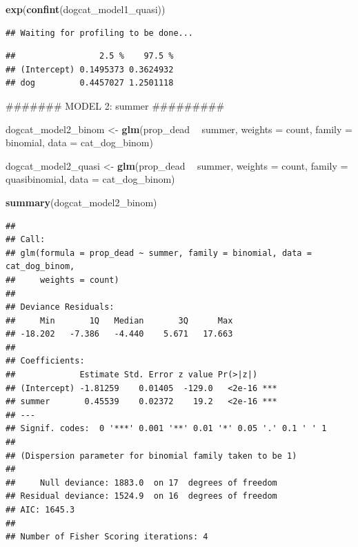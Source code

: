 \documentclass[]{article}
\newenvironment{Shaded}{\begin{snugshade}}{\end{snugshade}}
\newcommand{\KeywordTok}[1]{\textcolor[rgb]{0.13,0.29,0.53}{\textbf{#1}}}
\newcommand{\DataTypeTok}[1]{\textcolor[rgb]{0.13,0.29,0.53}{#1}}
\newcommand{\StringTok}[1]{\textcolor[rgb]{0.31,0.60,0.02}{#1}}
\newcommand{\OperatorTok}[1]{\textcolor[rgb]{0.81,0.36,0.00}{\textbf{#1}}}
\newcommand{\NormalTok}[1]{#1}
\begin{document}
\begin{Shaded}
\begin{Highlighting}[]
\KeywordTok{exp}\NormalTok{(}\KeywordTok{confint}\NormalTok{(dogcat_model1_quasi))}
\end{Highlighting}
\end{Shaded}

\begin{verbatim}
## Waiting for profiling to be done...
\end{verbatim}

\begin{verbatim}
##                 2.5 %    97.5 %
## (Intercept) 0.1495373 0.3624932
## dog         0.4457027 1.2501118
\end{verbatim}

\begin{Shaded}
\begin{Highlighting}[]
\NormalTok{####### MODEL 2: summer #########}

\NormalTok{dogcat_model2_binom <-}\StringTok{ }\KeywordTok{glm}\NormalTok{(prop_dead }\OperatorTok{~}\StringTok{ }\NormalTok{summer, }\DataTypeTok{weights =}\NormalTok{ count, }\DataTypeTok{family =}\NormalTok{ binomial, }\DataTypeTok{data =}\NormalTok{ cat_dog_binom)}

\NormalTok{dogcat_model2_quasi <-}\StringTok{ }\KeywordTok{glm}\NormalTok{(prop_dead }\OperatorTok{~}\StringTok{ }\NormalTok{summer, }\DataTypeTok{weights =}\NormalTok{ count, }\DataTypeTok{family =}\NormalTok{ quasibinomial, }\DataTypeTok{data =}\NormalTok{ cat_dog_binom)}

\KeywordTok{summary}\NormalTok{(dogcat_model2_binom)}
\end{Highlighting}
\end{Shaded}

\begin{verbatim}
## 
## Call:
## glm(formula = prop_dead ~ summer, family = binomial, data = cat_dog_binom, 
##     weights = count)
## 
## Deviance Residuals: 
##     Min       1Q   Median       3Q      Max  
## -18.202   -7.386   -4.440    5.671   17.663  
## 
## Coefficients:
##             Estimate Std. Error z value Pr(>|z|)    
## (Intercept) -1.81259    0.01405  -129.0   <2e-16 ***
## summer       0.45539    0.02372    19.2   <2e-16 ***
## ---
## Signif. codes:  0 '***' 0.001 '**' 0.01 '*' 0.05 '.' 0.1 ' ' 1
## 
## (Dispersion parameter for binomial family taken to be 1)
## 
##     Null deviance: 1883.0  on 17  degrees of freedom
## Residual deviance: 1524.9  on 16  degrees of freedom
## AIC: 1645.3
## 
## Number of Fisher Scoring iterations: 4
\end{verbatim}
\end{document}
